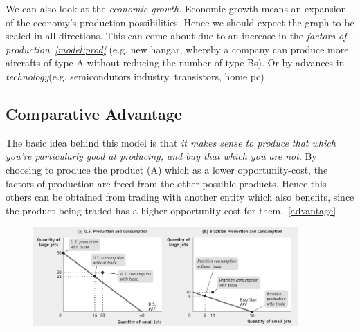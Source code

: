 \documentclass[english,course]{Notes}
\newcommand{\ita}[1]{\textit{#1}}
\begin{document}
\par{We can also look at the \ita{economic growth}. Economic growth means an expansion of the economy's production possibilities. Hence we should expect the graph to be scaled in all directions. This can come about due to an increase in the \ita{factors of production~\ref{model:prod}} (e.g. new hangar, whereby a company can produce more aircrafts of type A without reducing the number of type Bs). Or by advances in \ita{technology}(e.g. semicondutors industry, transistors, home pc)}



\subsection{Comparative Advantage}

\par{The basic idea behind this model is that \ita{it makes sense to produce that which you're particularly good at producing, and buy that which you are not}. By choosing to produce the product (A) which as a lower opportunity-cost, the factors of production are freed from the other possible products. Hence this others can be obtained from trading with another entity which also benefits, since the product being traded has a higher opportunity-cost for them.~\ref{advantage}}


\begin{figure}[ht]
\centering
\includegraphics[width=0.9\textwidth]{jetsTrade.png}
\end{figure}


\end{document}

